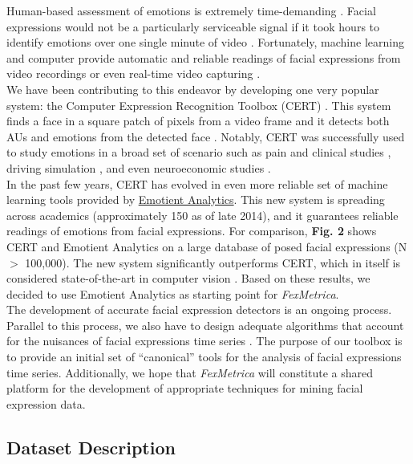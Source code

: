 \documentclass[11pt, oneside]{article}
\begin{document}
\noindent Human-based assessment of emotions is extremely time-demanding \cite{}. Facial expressions would not be a particularly serviceable signal if it took hours to identify emotions over one single minute of video \cite{}. Fortunately, machine learning and computer provide automatic and reliable readings of facial expressions from video recordings or even real-time video capturing \cite{}.\\

\noindent We have been contributing to this endeavor by developing one very popular system: the Computer Expression Recognition Toolbox (CERT) \cite{}. This system finds a face in a square patch of pixels from a video frame and it detects both AUs and emotions from the detected face \cite{}. Notably, CERT was successfully used to study emotions in a broad set of scenario such as pain and clinical studies \cite{}, driving simulation \cite{}, and even neuroeconomic studies \cite{}.\\

\noindent In the past few years, CERT has evolved in even more reliable set of machine learning tools provided by \href{http://www.emotient.com}{Emotient Analytics}. This new system is spreading across academics (approximately 150 as of late 2014), and it guarantees reliable readings of emotions from facial expressions. For comparison, \textbf{Fig. 2} shows  CERT and Emotient Analytics on a large database of posed facial expressions (N $>$ 100,000). The new system significantly outperforms CERT, which in itself is considered state-of-the-art in computer vision \cite{}. Based on these results, we decided to use Emotient Analytics as starting point for \emph{FexMetrica}.\\

\noindent The development of accurate facial expression detectors is an ongoing process. Parallel to this process, we also have to design adequate algorithms that account for the nuisances of facial expressions time series \cite{}. The purpose of our toolbox is to provide an initial set of ``canonical'' tools for the analysis of facial expressions time series. Additionally, we hope that \emph{FexMetrica} will constitute a shared platform for the development of appropriate techniques for mining facial expression data.\\

\subsection{Dataset Description}
\end{document}
